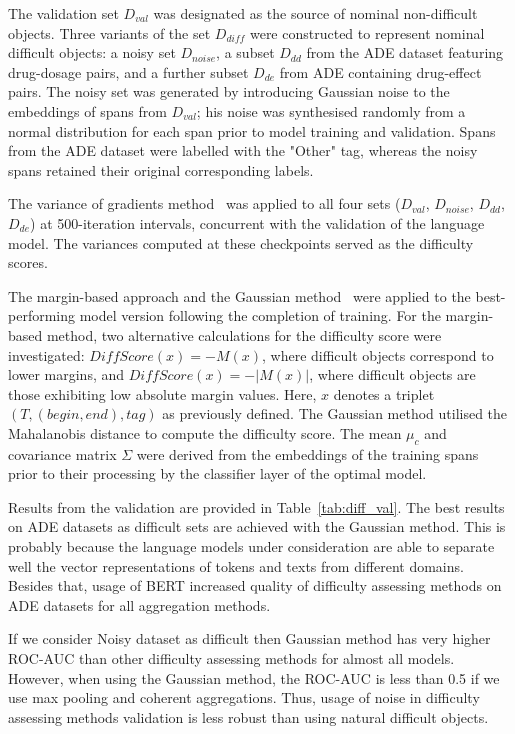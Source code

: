 \documentclass{article}
\begin{document}
The validation set \(D_{val}\) was designated as the source of nominal non-difficult objects. Three variants of the set \(D_{diff}\) were constructed to represent nominal difficult objects: a noisy set \(D_{noise}\), a subset \(D_{dd}\) from the ADE dataset featuring drug-dosage pairs, and a further subset \(D_{de}\) from ADE containing drug-effect pairs. The noisy set was generated by introducing Gaussian noise to the embeddings of spans from \(D_{val}\); his noise was synthesised randomly from a normal distribution for each span prior to model training and validation. Spans from the ADE dataset were labelled with the "Other" tag, whereas the noisy spans retained their original corresponding labels.

The variance of gradients method~\cite{agarwal2022estimating} was applied to all four sets (\(D_{val}\), \(D_{noise}\), \(D_{dd}\), \(D_{de}\)) at 500-iteration intervals, concurrent with the validation of the language model. The variances computed at these checkpoints served as the difficulty scores.

The margin-based approach and the Gaussian method~\cite{Lee2018ASU} were applied to the best-performing model version following the completion of training. For the margin-based method, two alternative calculations for the difficulty score were investigated: \(DiffScore(x) = -M(x)\), where difficult objects correspond to lower margins, and \(DiffScore(x) = -|M(x)|\), where difficult objects are those exhibiting low absolute margin values. Here, \(x\) denotes a triplet \((T, (begin, end), tag)\) as previously defined. The Gaussian method utilised the Mahalanobis distance to compute the difficulty score. The mean \(\mu_c\) and covariance matrix \(\Sigma\) were derived from the embeddings of the training spans prior to their processing by the classifier layer of the optimal model.

Results from the validation are provided in Table~\ref{tab:diff_val}. The best results on ADE datasets as difficult sets are achieved with the Gaussian method. This is probably because the language models under consideration are able to separate well the vector representations of tokens and texts from different domains. Besides that, usage of BERT increased quality of difficulty assessing methods on ADE datasets for all aggregation methods. 

If we consider Noisy dataset as difficult then Gaussian method has very higher ROC-AUC than other difficulty assessing methods for almost all models. However, when using the Gaussian method, the ROC-AUC is less than 0.5 if we use max pooling and coherent aggregations. Thus, usage of noise in difficulty assessing methods validation is less robust than using natural difficult objects.
\end{document}
